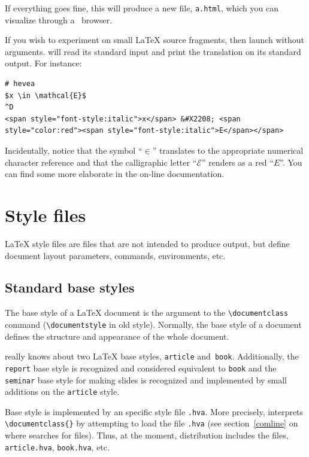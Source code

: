 If everything goes fine, this will produce a new file,
\texttt{a.html}, which you can visualize through  a {\html}~browser.


If you wish to experiment \hevea{} on small \LaTeX{} source fragments,
then launch \hevea{} without arguments. \hevea{} will read its
standard input and print the translation on its standard output.
For instance:
\begin{verbatim}
# hevea
$x \in \mathcal{E}$
^D
<span style="font-style:italic">x</span> &#X2208; <span style="color:red"><span style="font-style:italic">E</span></span>
\end{verbatim}
Incidentally, notice that the symbol ``$\in$'' translates to the
appropriate numerical character reference and that the calligraphic
letter ``$\mathcal{E}$'' renders as a red ``$E$''. You can find some
more elaborate  in
the on-line documentation.

\section{Style files}
\LaTeX{} style files are files that are not intended to produce output, but
define document layout parameters, commands, environments, etc.

\subsection{Standard base styles}

The base style of a \LaTeX{} document is the argument to the
\verb+\documentclass+ command (\verb+\documentstyle+ in old style).
Normally, the base style of a document defines the structure and
appearance of the whole document.



\noindent\hevea{} really knows about two \LaTeX{} base styles,
\texttt{article} and~\texttt{book}.
Additionally, the \texttt{report} base style is recognized and
considered equivalent to \texttt{book} and the
\texttt{seminar} base style for making slides is recognized and
implemented by small additions on the \texttt{article} style.


Base style  is implemented by an \hevea{} specific
style file \verb+.hva+.
More precisely, \hevea{} interprets
\verb+\documentclass{+\verb+}+ by attempting to load
the file \verb+.hva+ (see section~\ref{comline} on where
\hevea{} searches for files).
Thus, at the moment, \hevea{} distribution includes the files,
\texttt{article.hva}, \texttt{book.hva}, etc.



